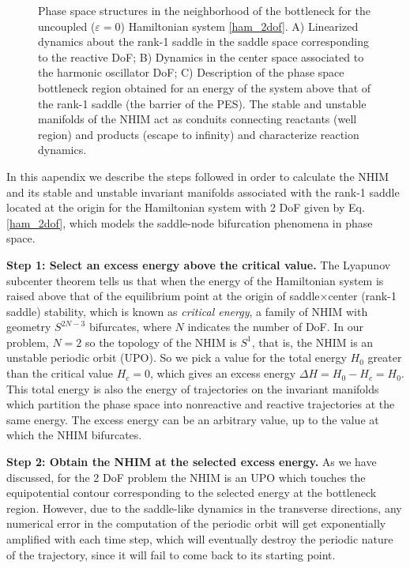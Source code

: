 \documentclass{ws-ijbc}
\begin{document}
\begin{figure}[!ht]
	\caption{Phase space structures in the neighborhood of the bottleneck for the uncoupled ($\varepsilon = 0$) Hamiltonian system \eqref{ham_2dof}. A) Linearized dynamics about the rank-1 saddle in the saddle space corresponding to the reactive DoF; B) Dynamics in the center space associated to the  harmonic oscillator DoF; C) Description of the phase space bottleneck region obtained for an energy of the system above that of the rank-1 saddle (the barrier of the PES). The stable and unstable manifolds of the NHIM act as conduits connecting reactants (well region) and products (escape to infinity) and characterize reaction dynamics.}
	\label{local_index1_ps}
\end{figure}


\label{sec:appB}

In this aapendix we describe the steps followed in order to calculate the NHIM and its stable and unstable  invariant manifolds associated with the rank-1 saddle located at the origin for the Hamiltonian system with 2 DoF given by Eq. \eqref{ham_2dof}, which models the saddle-node bifurcation phenomena in phase space.

\textbf{Step 1: Select an excess energy above the critical value.} The Lyapunov subcenter theorem\cite{wiggins_normally_2014} tells us that when the energy of the Hamiltonian system is raised above that of the equilibrium point at the origin of saddle$\times$center (rank-1 saddle) stability, which is known as {\it critical energy}, a family of NHIM with geometry $S^{2N-3}$ bifurcates, where $N$ indicates the number of DoF. In our problem, $N = 2$ so the topology of the NHIM is $S^1$, that is, the NHIM is an unstable periodic orbit (UPO). So we pick a value for the total energy $H_0$ greater than the critical value $H_c = 0$, which gives an excess energy $\Delta H = H_0 - H_c = H_0$. This total energy is also the energy of trajectories on the invariant manifolds which partition the phase space into nonreactive and reactive trajectories at the same energy. The excess energy can be an arbitrary value, up to  the value  at which the NHIM  bifurcates. 

\textbf{Step 2: Obtain the NHIM at the selected excess energy.} As we have discussed, for the 2 DoF problem the NHIM is an UPO which touches the equipotential contour corresponding to the selected energy at the bottleneck region. However, due to the saddle-like dynamics in the transverse directions, any numerical error in the computation of the periodic orbit will get exponentially amplified with each time step, which will eventually destroy the periodic nature of the trajectory, since it will fail to come back to its starting point. 
\end{document}

